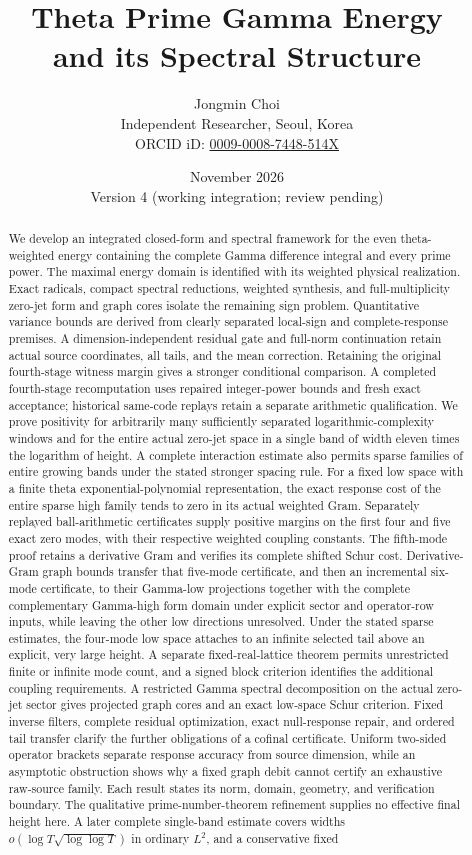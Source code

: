\documentclass[11pt,a4paper]{article}
\title{Theta Prime Gamma Energy\\and its Spectral Structure}
\author{Jongmin Choi\\[3pt]\small Independent Researcher, Seoul, Korea\\\small ORCID iD: \href{https://orcid.org/0009-0008-7448-514X}{0009-0008-7448-514X}}
\date{November 2026\\Version 4 (working integration; review pending)}
\numberwithin{equation}{section}
\theoremstyle{definition}\newtheorem{definition}[theorem]{Definition}
\theoremstyle{remark}\newtheorem{remark}[theorem]{Remark}
\begin{document}
\maketitle
\begin{abstract}
We develop an integrated closed-form and spectral framework for the even theta-weighted energy containing the complete Gamma difference integral and every prime power. The maximal energy domain is identified with its weighted physical realization. Exact radicals, compact spectral reductions, weighted synthesis, and full-multiplicity zero-jet form and graph cores isolate the remaining sign problem. Quantitative variance bounds are derived from clearly separated local-sign and complete-response premises. A dimension-independent residual gate and full-norm continuation retain actual source coordinates, all tails, and the mean correction. Retaining the original fourth-stage witness margin gives a stronger conditional comparison. A completed fourth-stage recomputation uses repaired integer-power bounds and fresh exact acceptance; historical same-code replays retain a separate arithmetic qualification. We prove positivity for arbitrarily many sufficiently separated logarithmic-complexity windows and for the entire actual zero-jet space in a single band of width eleven times the logarithm of height. A complete interaction estimate also permits sparse families of entire growing bands under the stated stronger spacing rule. For a fixed low space with a finite theta exponential-polynomial representation, the exact response cost of the entire sparse high family tends to zero in its actual weighted Gram. Separately replayed ball-arithmetic certificates supply positive margins on the first four and five exact zero modes, with their respective weighted coupling constants. The fifth-mode proof retains a derivative Gram and verifies its complete shifted Schur cost. Derivative-Gram graph bounds transfer that five-mode certificate, and then an incremental six-mode certificate, to their Gamma-low projections together with the complete complementary Gamma-high form domain under explicit sector and operator-row inputs, while leaving the other low directions unresolved. Under the stated sparse estimates, the four-mode low space attaches to an infinite selected tail above an explicit, very large height. A separate fixed-real-lattice theorem permits unrestricted finite or infinite mode count, and a signed block criterion identifies the additional coupling requirements. A restricted Gamma spectral decomposition on the actual zero-jet sector gives projected graph cores and an exact low-space Schur criterion. Fixed inverse filters, complete residual optimization, exact null-response repair, and ordered tail transfer clarify the further obligations of a cofinal certificate. Uniform two-sided operator brackets separate response accuracy from source dimension, while an asymptotic obstruction shows why a fixed graph debit cannot certify an exhaustive raw-source family. Each result states its norm, domain, geometry, and verification boundary. The qualitative prime-number-theorem refinement supplies no effective final height here. A later complete single-band estimate covers widths $o(\log T\sqrt{\log\log T})$ in ordinary $L^2$, and a conservative fixed 
\end{abstract}
\end{document}
